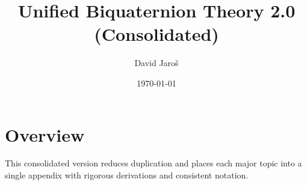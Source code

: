 \documentclass[12pt]{article}
\title{Unified Biquaternion Theory 2.0 (Consolidated)}
\author{David Jaroš}
\date{\today}
\begin{document}
\maketitle
\tableofcontents

\section{Overview}
This consolidated version reduces duplication and places each major topic into a single appendix with rigorous derivations and consistent notation.

\appendix






\end{document}
